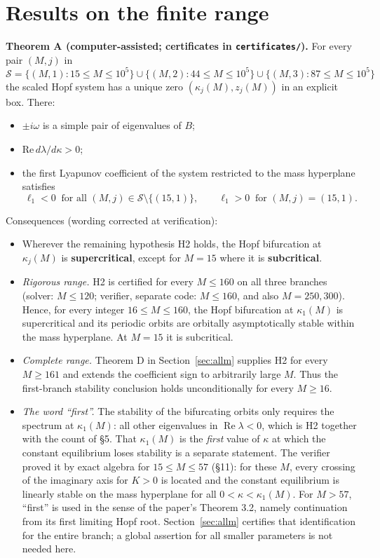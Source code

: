 \documentclass[11pt,a4paper]{report}
\begin{document}
\section{Results on the finite range}

\textbf{Theorem A (computer-assisted; certificates in \texttt{certificates/}).} For every pair \((M,j)\) in
\[\mathcal S=\{(M,1):15\le M\le 10^5\}\cup\{(M,2):44\le M\le10^5\}\cup\{(M,3):87\le M\le10^5\}\]
the scaled Hopf system has a unique zero \((\kappa_j(M),z_j(M))\) in an explicit box. There:
\begin{itemize}
\tightlist
\item \(\pm i\omega\) is a simple pair of eigenvalues of \(B\);
\item \(\mathrm{Re}\,d\lambda/d\kappa>0\);
\item the first Lyapunov coefficient of the system restricted to the mass hyperplane satisfies
\[\boxed{\ \ell_1<0\ \text{ for all }(M,j)\in\mathcal S\setminus\{(15,1)\},\qquad \ell_1>0\ \text{ for }(M,j)=(15,1).\ }\]
\end{itemize}

Consequences (wording corrected at verification):
\begin{itemize}
\tightlist
\item Wherever the remaining hypothesis H2 holds, the Hopf bifurcation at \(\kappa_j(M)\) is \textbf{supercritical}, except
for \(M=15\) where it is \textbf{subcritical}.
\item \emph{Rigorous range.} H2 is certified for every \(M\le160\) on all three branches (solver: \(M\le120\); verifier,
separate code: \(M\le160\), and also \(M=250,300\)). Hence, for every integer \(16\le M\le160\), the Hopf
bifurcation at \(\kappa_1(M)\) is supercritical and its periodic orbits are orbitally asymptotically stable within
the mass hyperplane. At \(M=15\) it is subcritical.
\item \emph{Complete range.} Theorem D in Section~\ref{sec:allm} supplies H2 for every
$M\ge161$ and extends the coefficient sign to arbitrarily large $M$. Thus the first-branch
stability conclusion holds unconditionally for every $M\ge16$.
\item \emph{The word ``first''.} The stability of the bifurcating orbits only requires the spectrum at \(\kappa_1(M)\):
all other eigenvalues in \(\operatorname{Re}\lambda<0\), which is H2 together with the count of §5. That
\(\kappa_1(M)\) is the \emph{first} value of \(\kappa\) at which the constant equilibrium loses stability is a
separate statement. The verifier proved it by exact algebra for \(15\le M\le57\) (§11): for these \(M\), every
crossing of the imaginary axis for \(K>0\) is located and the constant equilibrium is linearly stable on the mass
hyperplane for all \(0<\kappa<\kappa_1(M)\). For \(M>57\), ``first'' is used in the sense of the paper's
Theorem 3.2, namely continuation from its first limiting Hopf root. Section~\ref{sec:allm}
certifies that identification for the entire branch; a global assertion for all smaller parameters
is not needed here.
\end{itemize}
\end{document}
